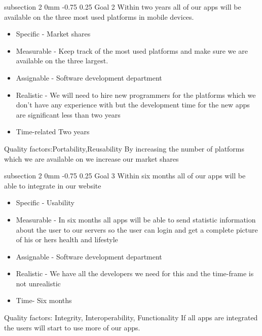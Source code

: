 \documentclass[a4paper,11pt]{article}
\makeatletter
\renewcommand{\subsection}{\@startsection
   {subsection}%
   {2}%
   {0mm}%
   {-0.75\baselineskip}%
   {0.25\baselineskip}%
   {\rmfamily\normalfont\slshape\normalsize}}%
\makeatother
\begin{document}
\subsection{Goal 2}
Within two years all of our apps will be available on the three most used platforms in mobile devices.
\begin{itemize}
\item Specific - Market shares
\item Measurable - Keep track of the most used platforms and make sure we are available on the three largest.
\item Assignable - Software development department
\item Realistic - We will need to hire new programmers for the platforms which we don't have any experience with but the development time for the new apps are significant less than two years
\item Time-related Two years
\end{itemize}
Quality factors:Portability,Reusability \newline
By increasing the number of platforms which we are available on we increase our market shares


\subsection{Goal 3}
Within six months all of our apps will be able to integrate in our website
\begin{itemize}
\item Specific - Usability
\item Measurable - In six months all apps will be able to send statistic information about the user to our servers so the user can login and get a complete picture of his or hers health and lifestyle
\item Assignable - Software development department
\item Realistic - We have all the developers we need for this and the time-frame is not unrealistic
\item Time- Six months
\end{itemize}
Quality factors: Integrity, Interoperability, Functionality \newline
If all apps are integrated the users will start to use more of our apps.
\end{document}
